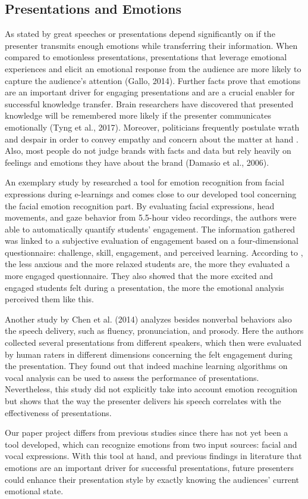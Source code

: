 \subsection{Presentations and Emotions}
\label{subsec:related_work_presentations_and_emotions}
As stated by  great speeches or presentations depend significantly on if the presenter transmits enough emotions while transferring their information. When compared to emotionless presentations, presentations that leverage emotional experiences and elicit an emotional response from the audience are more likely to capture the audience's attention (Gallo, 2014). Further facts prove that emotions are an important driver for engaging presentations and are a crucial enabler for successful knowledge transfer. Brain researchers have discovered that presented knowledge will be remembered more likely if the presenter communicates emotionally (Tyng et al., 2017). Moreover, politicians frequently postulate wrath and despair in order to convey empathy and concern about the matter at hand \cite{derrico_tracking_2019}. Also, most people do not judge brands with facts and data but rely heavily on feelings and emotions they have about the brand (Damasio et al., 2006).

An exemplary study by  researched a tool for emotion recognition from facial expressions during e-learnings and comes close to our developed tool concerning the facial emotion recognition part. By evaluating facial expressions, head movements, and gaze behavior from 5.5-hour video recordings, the authors were able to automatically quantify students’ engagement. The information gathered was linked to a subjective evaluation of engagement based on a four-dimensional questionnaire: challenge, skill, engagement, and perceived learning. According to , the less anxious and the more relaxed students are, the more they evaluated a more engaged questionnaire. They also showed that the more excited and engaged students felt during a presentation, the more the emotional analysis perceived them like this.

Another study by Chen et al. (2014) analyzes besides nonverbal behaviors also the speech delivery, such as fluency, pronunciation, and prosody. Here the authors collected several presentations from different speakers, which then were evaluated by human raters in different dimensions concerning the felt engagement during the presentation. They found out that indeed machine learning algorithms on vocal analysis can be used to assess the performance of presentations. Nevertheless, this study did not explicitly take into account emotion recognition but shows that the way the presenter delivers his speech correlates with the effectiveness of presentations.

Our paper project differs from previous studies since there has not yet been a tool developed, which can recognize emotions from two input sources: facial and vocal expressions. With this tool at hand, and previous findings in literature that emotions are an important driver for successful presentations, future presenters could enhance their presentation style by exactly knowing the audiences’ current emotional state.
